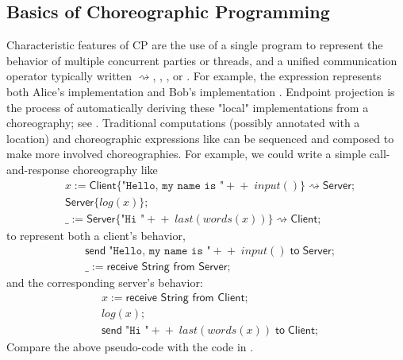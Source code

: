 \subsection{Basics of Choreographic Programming}
Characteristic features of CP are the use of a single program to represent the behavior of multiple concurrent parties or threads,
and a unified communication operator typically written $\rightsquigarrow$, \inlinecode{~>}, , or .
For example, the expression 
represents both Alice's implementation 
and Bob's implementation .
Endpoint projection is the process of automatically deriving these "local" implementations from a choreography; see .
Traditional computations (possibly annotated with a location)
and choreographic expressions like  can be sequenced and composed to make more involved choreographies.
For example, we could write a simple call-and-response choreography like
\begin{align*}
  & x := \textsf{Client}\{\texttt{"Hello, my name is "} +\!\!+\; \textit{input}()\} \rightsquigarrow \textsf{Server} ; \\[-0.9em]
  & \textsf{Server}\{\textit{log}(x)\} ; \\[-0.9em]
  & \_ := \textsf{Server}\{\texttt{"Hi "} +\!\!+\; \textit{last}(\textit{words}(x))\} \rightsquigarrow \textsf{Client} ;
\end{align*}
to represent both a client's behavior,
\begin{align*}
  & \textsf{send}\; \texttt{"Hello, my name is "} +\!\!+\; \textit{input}() \;\textsf{to}\; \textsf{Server} ; \\[-0.9em]
  & \_ := \textsf{receive String from Server} ;
\end{align*}
and the corresponding server's behavior:
\begin{align*}
  & x := \textsf{receive String from Client} ; \\[-0.9em]
  & \textit{log}(x) ; \\[-0.9em]
  & \textsf{send}\; \texttt{"Hi "} +\!\!+\; \textit{last}(\textit{words}(x)) \;\textsf{to}\; \textsf{Client} ;
\end{align*}
Compare the above pseudo-code with the \MultiChor code in .
